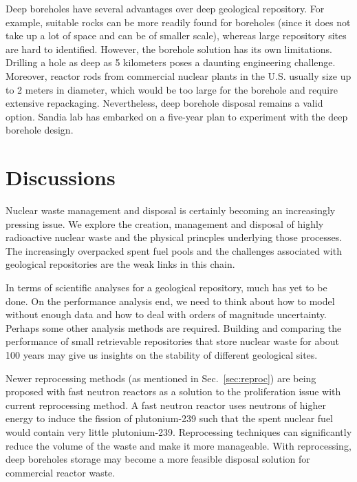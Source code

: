 \documentclass[nofootinbib,preprint,aps]{revtex4-1}
\begin{document}
        Deep boreholes have several advantages over deep geological repository. For example, suitable
        rocks can be more readily found for boreholes (since it does not take up a lot of space and can be
        of smaller scale),
        whereas large repository sites are hard to identified. \cite{b09,c15}
        However, the borehole solution has its own limitations.
        Drilling a hole as deep as 5 kilometers poses a daunting engineering challenge.
        Moreover, reactor rods from commercial nuclear plants in the U.S. usually size up to 2 meters in diameter,
        which would be too large for the borehole and require extensive repackaging.
        Nevertheless, deep borehole disposal remains a valid option.
        Sandia lab has embarked on a five-year plan to experiment with the deep borehole design.\cite{c15}

\section{Discussions}
Nuclear waste management and disposal is certainly becoming an increasingly pressing issue.
We explore the creation, management and disposal of highly radioactive nuclear waste and the physical
princples underlying those processes. The increasingly overpacked spent fuel pools and the challenges
associated with geological repositories are the weak links in this chain.

In terms of scientific analyses for a geological repository, much has yet to be done.
On the performance analysis end, we need
to think about how to model without enough data and how to deal with orders of magnitude uncertainty.
Perhaps some other analysis methods are required. Building and comparing the performance of 
small retrievable repositories that store
nuclear waste for about 100 years may give us insights on the stability of different geological sites.

Newer reprocessing methods (as mentioned in Sec.~\ref{sec:reproc}) are being proposed with
fast neutron reactors as a solution to the proliferation issue with current reprocessing method.
A fast neutron reactor uses neutrons of higher energy to induce the fission of plutonium-239
such that the spent nuclear fuel would contain very little plutonium-239. Reprocessing 
techniques can significantly reduce the volume of the waste and make it more
manageable. With reprocessing, deep boreholes storage may become a more feasible disposal solution 
for commercial reactor waste.

\newpage


\end{document}
